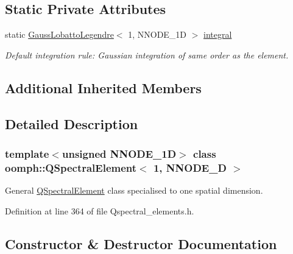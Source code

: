 \subsection*{Static Private Attributes}
\begin{DoxyCompactItemize}
\item 
static \hyperlink{classoomph_1_1GaussLobattoLegendre}{Gauss\+Lobatto\+Legendre}$<$ 1, N\+N\+O\+D\+E\+\_\+1D $>$ \hyperlink{classoomph_1_1QSpectralElement_3_011_00_01NNODE__1D_01_4_a0e7111fe24ec8864f7de58997ec74f03}{integral}
\begin{DoxyCompactList}\small\item\em Default integration rule\+: Gaussian integration of same \textquotesingle{}order\textquotesingle{} as the element. \end{DoxyCompactList}\end{DoxyCompactItemize}
\subsection*{Additional Inherited Members}


\subsection{Detailed Description}
\subsubsection*{template$<$unsigned N\+N\+O\+D\+E\+\_\+1D$>$\newline
class oomph\+::\+Q\+Spectral\+Element$<$ 1, N\+N\+O\+D\+E\+\_\+D $>$}

General \hyperlink{classoomph_1_1QSpectralElement}{Q\+Spectral\+Element} class specialised to one spatial dimension. 

Definition at line 364 of file Qspectral\+\_\+elements.\+h.



\subsection{Constructor \& Destructor Documentation}
\mbox{\label{classoomph_1_1QSpectralElement_3_011_00_01NNODE__1D_01_4_a747bf14338887c74303f56febdfba957}} 

